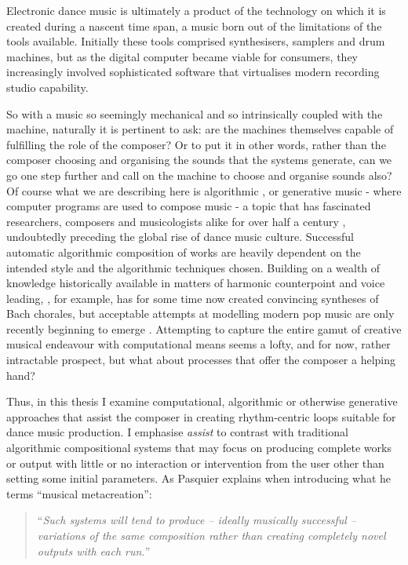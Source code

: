 Electronic dance music is ultimately a product of the technology on which it is created during a nascent time span, a music born out of the limitations of the tools available. Initially these tools comprised synthesisers, samplers and drum machines, but as the digital computer became viable for consumers, they increasingly involved sophisticated software that virtualises modern recording studio capability. 

So with a music so seemingly mechanical and so intrinsically coupled with the machine, naturally it is pertinent to ask: are the machines themselves capable of fulfilling the role of the composer? Or to put it in other words, rather than the composer choosing and organising the sounds that the systems generate, can we go one step further and call on the machine to choose and organise sounds also? Of course what we are describing here is algorithmic \citep{Roads1996}, or generative music \citep{Collins2008} - where computer programs are used to compose music - a topic that has fascinated researchers, composers and musicologists alike for over half a century \citep{Burns1994, Fernandez2013}, undoubtedly preceding the global rise of dance music culture. Successful automatic algorithmic composition of works are heavily dependent on the intended style and the algorithmic techniques chosen. Building on a wealth of knowledge historically available in matters of harmonic counterpoint and voice leading, \cite{Cope1991}, for example, has for some time now created convincing syntheses of Bach chorales, but acceptable attempts at modelling modern pop music are only recently beginning to emerge \citep{Ghedini2015}. Attempting to capture the entire gamut of creative musical endeavour with computational means seems a lofty, and for now, rather intractable prospect, but what about processes that offer the composer a helping hand?

Thus, in this thesis I examine computational, algorithmic or otherwise generative approaches that assist the composer in creating rhythm-centric loops suitable for dance music production. I emphasise \textit{assist} to contrast with traditional algorithmic compositional systems that may focus on producing complete works or output with little or no interaction or intervention from the user other than setting some initial parameters. As Pasquier explains when introducing what he terms “musical metacreation”:

\blockcquote[]{Pasquier2017}{``\textit{Such systems will tend to produce – ideally musically successful – variations of the same composition rather than creating completely novel outputs with each run.}''}

